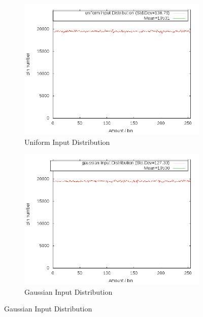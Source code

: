 \documentclass[11pt]{article} %
\begin{document}
\begin{figure}[H]
  \centering
  \begin{subfigure}[b]{0.45\textwidth}
    \includegraphics[width=\textwidth]{Graphs/Dist/Tabulation_uniform_dist.png}
    \caption{Uniform Input Distribution}
    \label{fig:tab_dist_uni}
  \end{subfigure}
  \begin{subfigure}[b]{0.45\textwidth}
    \includegraphics[width=\textwidth]{Graphs/Dist/Tabulation_gaussian_dist.png}
    \caption{Gaussian Input Distribution}
    \label{fig:tab_dist_gauss}
  \end{subfigure}
\end{figure}
\end{document}
